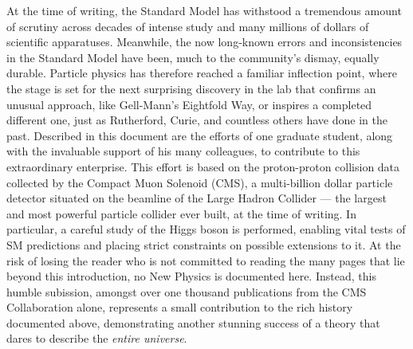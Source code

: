 \begin{dissertationintroduction}
At the time of writing, the Standard Model has withstood a tremendous amount of scrutiny across decades of intense study and many millions of dollars of scientific apparatuses. %
Meanwhile, the now long-known errors and inconsistencies in the Standard Model have been, much to the community's dismay, equally durable. %
Particle physics has therefore reached a familiar inflection point, where the stage is set for the next surprising discovery in the lab that confirms an unusual approach, like Gell-Mann's Eightfold Way, or inspires a completed different one, just as Rutherford, Curie, and countless others have done in the past. 
Described in this document are the efforts of one graduate student, along with the invaluable support of his many colleagues, to contribute to this extraordinary enterprise. 
This effort is based on the proton-proton collision data collected by the Compact Muon Solenoid (CMS), a multi-billion dollar particle detector situated on the beamline of the Large Hadron Collider --- the largest and most powerful particle collider ever built, at the time of writing. 
In particular, a careful study of the Higgs boson is performed, enabling vital tests of SM predictions and placing strict constraints on possible extensions to it.
At the risk of losing the reader who is not committed to reading the many pages that lie beyond this introduction, no New Physics is documented here.
Instead, this humble subission, amongst over one thousand publications from the CMS Collaboration alone, represents a small contribution to the rich history documented above, demonstrating another stunning success of a theory that dares to describe the \textit{entire universe}.
\end{dissertationintroduction}
